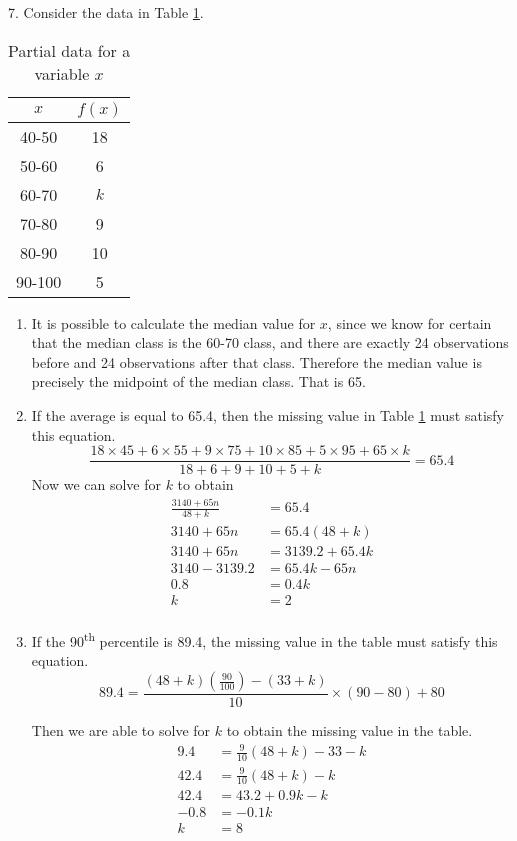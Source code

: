 \documentclass[fleqn]{article}
\begin{document}
\begin{answers}
	\item[7.]
	Consider the data in Table \ref{q7}.
	\begin{table}[htb]
		\centering
		\begin{tabular}{||c|c||}
			\hline
			\(x\) & \(f(x)\) \\
			\hline
			40-50 & 18 \\
			50-60 & 6 \\
			60-70 & \(k\) \\
			70-80 & 9 \\
			80-90 & 10 \\
			90-100 & 5 \\
			\hline
		\end{tabular}
		\caption{Partial data for a variable \(x\)}
		\label{q7}
	\end{table}
	\begin{enumerate}
		\item %
		It is possible to calculate the median value for \(x\), since we know for certain that the median class is the 60-70 class, and there are exactly 24 observations before and 24 observations after that class. Therefore the median value is precisely the midpoint of the median class. That is 65.

		\item %
		If the average is equal to 65.4, then the missing value in Table \ref{q7} must satisfy this equation.
		\[\frac{18 \times 45 + 6 \times 55 + 9 \times 75 + 10 \times 85 + 5 \times 95 + 65 \times k}{18 + 6 + 9 + 10 + 5 + k} = 65.4\]
		Now we can solve for \(k\) to obtain
		\begin{align*}
			\frac{3140 + 65n}{48 + k} &= 65.4 \\
			3140 + 65n &= 65.4(48 + k) \\
			3140 + 65n &= 3139.2 + 65.4k \\
			3140 - 3139.2 &= 65.4k - 65n \\
			0.8 &= 0.4k \\
			k &= 2 \\
		\end{align*}

		\item %
		If the 90\textsuperscript{th} percentile is 89.4, the missing value in the table must satisfy this equation.
		\[89.4 = \frac{(48 + k)\left(\frac{90}{100}\right) - (33 + k)}{10} \times (90 - 80) + 80\]

		Then we are able to solve for \(k\) to obtain the missing value in the table.
		\begin{align*}
			9.4 &= \frac{9}{10}(48 + k) - 33 - k \\
			42.4 &= \frac{9}{10}(48 + k) - k \\
			42.4 &= 43.2 + 0.9k - k \\
			-0.8 &= - 0.1k \\
			k &= 8 \\
		\end{align*}
	\end{enumerate}

\end{answers}
\end{document}
